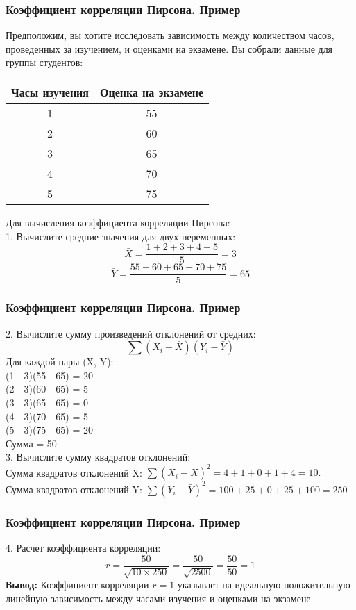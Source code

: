 \documentclass[aspectratio=169]{beamer}
\begin{document}
\begin{frame}
\frametitle{Коэффициент корреляции Пирсона. Пример}
Предположим, вы хотите исследовать зависимость между количеством часов, проведенных за изучением, и оценками на экзамене. Вы собрали данные для группы студентов:\\
\begin{center}
\begin{tabular}{ |c|c| } 
 \hline
 Часы изучения & Оценка на экзамене\\ 
 \hline
 1 & 55\\
 \hline
 2 & 60\\
 \hline
 3 & 65\\
 \hline
 4 & 70\\
 \hline
 5 & 75\\
 \hline
\end{tabular}
\end{center}
Для вычисления коэффициента корреляции Пирсона:\\
1. Вычислите средние значения для двух переменных:
   \[
   \bar{X} = \frac{1 + 2 + 3 + 4 + 5}{5} = 3
   \]
   \[
   \bar{Y} = \frac{55 + 60 + 65 + 70 + 75}{5} = 65
   \]
\end{frame}

\begin{frame}
\frametitle{Коэффициент корреляции Пирсона. Пример}
2. Вычислите сумму произведений отклонений от средних:
   \[
   \sum (X_i - \bar{X})(Y_i - \bar{Y})
   \]
   Для каждой пары (X, Y):\\
   \quad (1 - 3)(55 - 65) = 20\\
   \quad (2 - 3)(60 - 65) = 5\\
   \quad (3 - 3)(65 - 65) = 0\\
   \quad (4 - 3)(70 - 65) = 5\\
   \quad (5 - 3)(75 - 65) = 20\\
   \quad Сумма = 50\\
3. Вычислите сумму квадратов отклонений:\\
Сумма квадратов отклонений X: $\sum (X_i - \bar{X})^2 = 4 + 1 + 0 + 1 + 4 = 10.$\\
Сумма квадратов отклонений Y: $\sum (Y_i - \bar{Y})^2 = 100 + 25 + 0 + 25 + 100 = 250$\\
\end{frame}

\begin{frame}
\frametitle{Коэффициент корреляции Пирсона. Пример}
4. Расчет коэффициента корреляции:
   \[
   r = \frac{50}{\sqrt{10 \times 250}} = \frac{50}{\sqrt{2500}} = \frac{50}{50} = 1
   \]
{\bf Вывод:} Коэффициент корреляции \( r = 1 \) указывает на идеальную положительную линейную зависимость между часами изучения и оценками на экзамене.
\end{frame}
\end{document}
